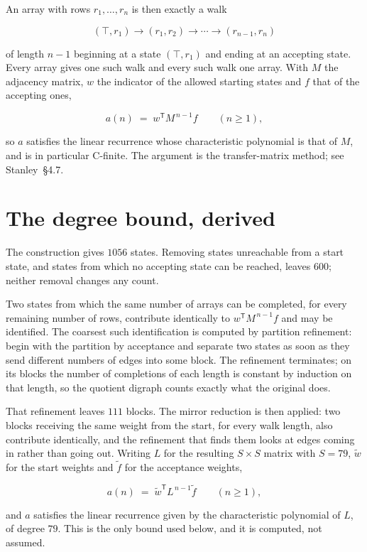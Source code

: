 \documentclass[11pt]{article}
\theoremstyle{definition}
\begin{document}
An array with rows $r_1,\dots,r_n$ is then exactly a walk

\[(\top,r_1) \to (r_1,r_2) \to \cdots \to (r_{n-1},r_n)\]

of length $n-1$ beginning at a state $(\top,r_1)$ and ending at an accepting state. Every array gives one such walk and every such walk one array. With $M$ the adjacency matrix, $w$ the indicator of the allowed starting states and $f$ that of the accepting ones,

\[a(n) \;=\; w^{\mathsf T} M^{\,n-1} f \qquad (n \ge 1),\]

so $a$ satisfies the linear recurrence whose characteristic polynomial is that of $M$, and is in particular C-finite. The argument is the transfer-matrix method; see Stanley~\S4.7.

\section{The degree bound, derived}

The construction gives $1056$ states. Removing states unreachable from a start state, and states from which no accepting state can be reached, leaves $600$; neither removal changes any count.

Two states from which the same number of arrays can be completed, for every remaining number of rows, contribute identically to $w^{\mathsf T}M^{\,n-1}f$ and may be identified. The coarsest such identification is computed by partition refinement: begin with the partition by acceptance and separate two states as soon as they send different numbers of edges into some block. The refinement terminates; on its blocks the number of completions of each length is constant by induction on that length, so the quotient digraph counts exactly what the original does.

That refinement leaves $111$ blocks. The mirror reduction is then applied: two blocks receiving the same weight from the start, for every walk length, also contribute identically, and the refinement that finds them looks at edges coming in rather than going out. Writing $L$ for the resulting $S \times S$ matrix with $S = 79$, $\tilde w$ for the start weights and $\tilde f$ for the acceptance weights,

\[a(n) \;=\; \tilde w^{\mathsf T} L^{\,n-1} \tilde f \qquad (n \ge 1),\]

and $a$ satisfies the linear recurrence given by the characteristic polynomial of $L$, of degree $79$. This is the only bound used below, and it is computed, not assumed.
\end{document}
